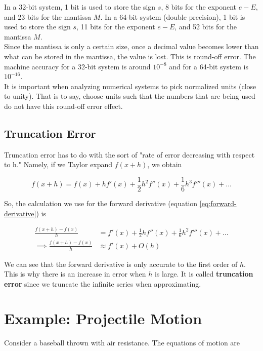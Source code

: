 \documentclass[]{article}
\begin{document}
In a 32-bit system, 1 bit is used to store the sign $s$, 8 bits for the exponent $e-E$, and 23 bits for the mantissa $M$. In a 64-bit system (double precision), 1 bit is used to store the sign $s$, 11 bits for the exponent $e-E$, and 52 bits for the mantissa $M$. \\

Since the mantissa is only a certain size, once a decimal value becomes lower than what can be stored in the mantissa, the value is lost. This is round-off error. The machine accuracy for a 32-bit system is around $10^{-8}$ and for a 64-bit system is $10^{-16}$.\\

It is important when analyzing numerical systems to pick normalized units (close to unity). That is to say, choose units such that the numbers that are being used do not have this round-off error effect. \\

\subsection{Truncation Error}\bigbreak

Truncation error has to do with the sort of "rate of error decreasing with respect to h." Namely, if we Taylor expand $f(x+h)$, we obtain

\[f(x+h) = f(x) + hf'(x) + \frac{1}{2}h^2f''(x) + \frac{1}{6}h^3f'''(x) + ...\] 

So, the calculation we use for the forward derivative (equation \ref{eq:forward-derivative}) is

\begin{align*}
	\frac{f(x+h) - f(x)}{h} &= f'(x) + \frac{1}{2}hf''(x) + \frac{1}{6}h^2f'''(x) + ...\\
	\implies \frac{f(x+h) - f(x)}{h} &\approx f'(x) + O(h)
\end{align*}

We can see that the forward derivative is only accurate to the first order of $h$. This is why there is an increase in error when $h$ is large. It is called \textbf{truncation error} since we truncate the infinite series when approximating.

\section{Example: Projectile Motion}\bigbreak\bigbreak

Consider a baseball thrown with air resistance. The equations of motion are
\end{document}
